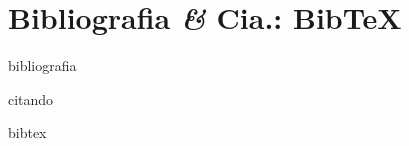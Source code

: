 \section{Bibliografia {\it \&} Cia.: Bib\TeX}\label{sec:biblio-indice-glossario}

bibliografia

citando

bibtex
